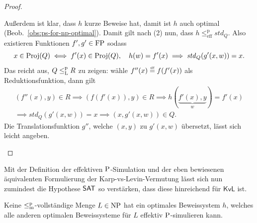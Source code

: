 \begin{proof}
\begin{prooflist}[label={}]
    Außerdem ist klar, dass $h$ kurze Beweise hat, damit ist $h$ auch optimal (Beob.~\ref{obs:ps-for-np-optimal}). %
    Damit gilt nach (2) nun, dass $h\leq^\mathrm p_\mathrm{eff} \mathit{std}_Q$. Also existieren Funktionen $f',g'\in\FP$ sodass
    \[ x\in \Proj(Q)\iff f'(x)\in\Proj(Q),\quad h(w)=f'(x) \implies \mathit{std}_Q(g'(x,w))=x. \]%
    Das reicht aus, $Q\leqlp R$ zu zeigen: wähle $f''(x)\defeq f(f'(x))$ als Reduktionsfunktion, dann gilt
    \begin{gather*}
        (f''(x), y)\in R \implies (f(f'(x)), y)\in R \implies h(\underbrace{f'(x),y}_{w})=f'(x) \\
    \implies \mathit{std}_Q(g'(x,w))=x \implies (x,g'(x,w))\in Q. \end{gather*}
    Die Translationsfunktion $g''$, welche $(x,y)$ zu $g'(x,w)$ übersetzt, lässt sich leicht angeben.
\end{prooflist}
\end{proof}

Mit der Definition der effektiven $\P$-Simulation und der eben bewiesenen äquivalenten Formulierung der Karp-vs-Levin-Vermutung lässt sich nun zumindest die Hypothese $\hSAT$ so verstärken, dass diese hinreichend für $\mathsf{KvL}$ ist.


\begin{conjecture}
    Keine $\leqmp$-vollständige Menge $L\in\NP$ hat ein optimales Beweissystem $h$, welches alle anderen optimalen Beweissysteme für $L$ effektiv $\P$-simulieren kann. 
\end{conjecture}

%

